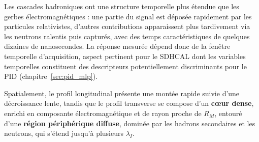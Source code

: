 Les cascades hadroniques ont une structure temporelle plus étendue que les gerbes
électromagnétiques : une partie du signal est déposée rapidement par les particules relativistes,
d'autres contributions apparaissent plus tardivement via les neutrons ralentis puis capturés, avec
des temps caractéristiques de quelques dizaines de nanosecondes. La réponse mesurée dépend donc de
la fenêtre temporelle d'acquisition, aspect pertinent pour le SDHCAL dont les variables temporelles
constituent des descripteurs potentiellement discriminants pour le PID
(chapitre~\ref{sec:pid_mlp}).

Spatialement, le profil longitudinal présente une montée rapide suivie d'une décroissance lente,
tandis que le profil transverse se compose d'un \textbf{cœur dense}, enrichi en composante
électromagnétique et de rayon proche de $R_M$, entouré d'une \textbf{région périphérique diffuse},
dominée par les hadrons secondaires et les neutrons, qui s'étend jusqu'à plusieurs $\lambda_I$.

